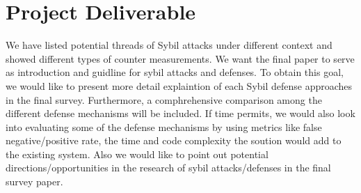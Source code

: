 \documentclass[conference]{IEEEtran}
\begin{document}
\section{Project Deliverable}
We have listed potential threads of Sybil attacks under different context and showed different types of counter measurements. 
We want the final paper to serve as introduction and guidline for sybil attacks and defenses.
To obtain this goal, we would like to present more detail explaintion of each Sybil defense approaches in the final survey. Furthermore, a comphrehensive comparison among the different defense mechanisms will be included.
If time permits, we would also look into evaluating some of the defense mechanisms by using metrics like false negative/positive rate, the time and code complexity the soution would add to the existing system.
Also we would like to point out potential directions/opportunities in the research of sybil attacks/defenses in the final survey paper.

%
%

\end{document}
